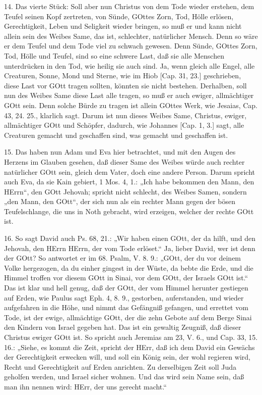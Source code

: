 14. Das vierte Stück: Soll aber nun Christus von dem Tode wieder erstehen, dem Teufel seinen Kopf zertreten, von Sünde, GOttes Zorn, Tod, Hölle erlösen, Gerechtigkeit, Leben und Seligkeit wieder bringen, so muß er und kann nicht allein sein des Weibes Same, das ist, schlechter, natürlicher Mensch. Denn so wäre er dem Teufel und dem Tode viel zu schwach gewesen. Denn Sünde, GOttes Zorn, Tod, Hölle und Teufel, sind so eine schwere Last, daß sie alle Menschen unterdrücken in den Tod, wie heilig sie auch sind. Ja, wenn gleich alle Engel, alle Creaturen, Sonne, Mond und Sterne, wie im Hiob [Cap. 31, 23.] geschrieben, diese Last vor GOtt tragen sollten, könnten sie nicht bestehen. Derhalben, soll nun des Weibes Same diese Last alle tragen, so muß er auch ewiger, allmächtiger GOtt sein. Denn solche Bürde zu tragen ist allein GOttes Werk, wie Jesaias, Cap. 43, 24. 25., klarlich sagt. Darum ist nun dieses Weibes Same, Christus, ewiger, allmächtiger GOtt und Schöpfer, dadurch, wie Johannes [Cap. 1, 3.] sagt, alle Creaturen gemacht und geschaffen sind, was gemacht und geschaffen ist.

15. Das haben nun Adam und Eva hier betrachtet, und mit den Augen des Herzens im Glauben gesehen, daß dieser Same des Weibes würde auch rechter natürlicher GOtt sein, gleich dem Vater, doch eine andere Person. Darum spricht auch Eva, da sie Kain gebiert, 1 Mos. 4, 1.: „Ich habe bekommen den Mann, den HErrn“, den GOtt Jehovah; spricht nicht schlecht, des Weibes Samen, sondern „den Mann, den GOtt“, der sich nun als ein rechter Mann gegen der bösen Teufelschlange, die uns in Noth gebracht, wird erzeigen, welcher der rechte GOtt ist.

16. So sagt David auch Ps. 68, 21.: „Wir haben einen GOtt, der da hilft, und den Jehovah, den HErrn HErrn, der vom Tode erlöset.“ Ja, lieber David, wer ist denn der GOtt? So antwortet er im 68. Psalm, V. 8. 9.: „GOtt, der du vor deinem Volke hergezogen, da du einher gingest in der Wüste, da bebte die Erde, und die Himmel troffen vor diesem GOtt in Sinai, vor dem GOtt, der Israels GOtt ist.“ Das ist klar und hell genug, daß der GOtt, der vom Himmel herunter gestiegen auf Erden, wie Paulus sagt Eph. 4, 8. 9., gestorben, auferstanden, und wieder
aufgefahren in die Höhe, und nimmt das Gefängniß gefangen, und errettet vom Tode, ist der ewige, allmächtige GOtt, der die zehn Gebote auf dem Berge Sinai den Kindern von Israel gegeben hat. Das ist ein gewaltig Zeugniß, daß dieser Christus ewiger GOtt ist. So spricht auch Jeremias am 23, V. 6., und Cap. 33, 15. 16.: „Siehe, es kommt die Zeit, spricht der HErr, daß ich dem David ein Gewächs der Gerechtigkeit erwecken will, und soll ein König sein, der wohl regieren wird, Recht und Gerechtigkeit auf Erden anrichten. Zu derselbigen Zeit soll Juda geholfen werden, und Israel sicher wohnen. Und das wird sein Name sein, daß man ihn nennen wird: HErr, der uns gerecht macht.“

